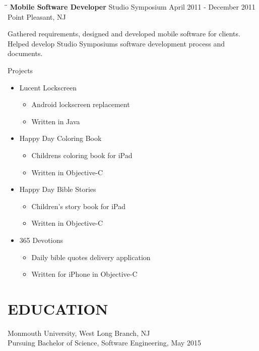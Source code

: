 \documentclass{res}
\begin{document}
\begin{resume}
   \begin{tabbing}
   \hspace{2.3in}\= \hspace{2.6in}\= \kill %
    {\bf Mobile Software Developer} \>Studio Symposium     \>April 2011 - December 2011\\
                             \>Point Pleasant, NJ
   \end{tabbing}\vspace{-20pt}      %
   Gathered requirements, designed and developed mobile software for clients. Helped develop Studio Symposiums software development process and documents.

    Projects
    \begin{itemize}
        \item Lucent Lockscreen
        \begin{itemize}
            \item Android lockscreen replacement
            \item Written in Java
        \end{itemize}
        \item Happy Day Coloring Book
        \begin{itemize}
            \item Childrens coloring book for iPad
            \item Written in Objective-C
        \end{itemize}
        \item Happy Day Bible Stories
        \begin{itemize}
            \item Children's story book for iPad
            \item Written in Objective-C
        \end{itemize}
        \item 365 Devotions
        \begin{itemize}
            \item Daily bible quotes delivery application
            \item Written for iPhone in Objective-C
        \end{itemize}
    \end{itemize}


\section{EDUCATION}          
    Monmouth University, West Long Branch, NJ  \\        
    Pursuing Bachelor of Science, Software Engineering, May 2015   \\       



\end{resume}
\end{document}
